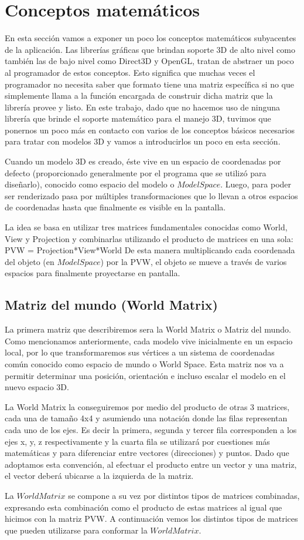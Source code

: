 \documentclass[a4paper]{article}
\begin{document}
\section{Conceptos matemáticos}
En esta sección vamos a exponer un poco los conceptos matemáticos subyacentes de la aplicación. Las librerías gráficas que brindan soporte 3D de alto nivel como también las de bajo nivel como Direct3D y OpenGL, tratan de abstraer un poco al programador de estos conceptos. Esto significa que muchas veces el programador no necesita saber que formato tiene una matriz específica si no que simplemente llama a la función encargada de construir dicha matriz que la librería provee y listo. En este trabajo, dado que no hacemos uso de ninguna librería que brinde el soporte matemático para el manejo 3D, tuvimos que ponernos un poco más en contacto con varios de los conceptos básicos necesarios para tratar con modelos 3D y vamos a introducirlos un poco en esta sección.

Cuando un modelo 3D es creado, éste vive en un espacio de coordenadas por defecto (proporcionado generalmente por el programa que se utilizó para diseñarlo), conocido como espacio del modelo o $Model Space$. Luego, para poder ser renderizado pasa por múltiples transformaciones que lo llevan a otros espacios de coordenadas hasta que finalmente es visible en la pantalla. 
\par La idea se basa en utilizar tres matrices fundamentales conocidas como World, View y Projection y combinarlas utilizando el producto de matrices en una sola: 
PVW = Projection*View*World
De esta manera  multiplicando cada coordenada del objeto (en $Model Space$) por la PVW, el objeto se mueve a través de varios espacios para finalmente proyectarse en pantalla.

\subsection{Matriz del mundo (World Matrix)}
La primera matriz que describiremos sera la  World Matrix o Matriz del mundo.
Como mencionamos anteriormente, cada modelo vive inicialmente en un espacio local,  por lo que transformaremos sus vértices a un sistema de coordenadas común conocido como espacio de mundo o World Space. Esta matriz nos va a permitir determinar una posición,  orientación e incluso escalar el modelo en el nuevo espacio 3D.
\par La World Matrix la conseguiremos por medio del producto de otras 3 matrices, cada una de tamaño 4x4 y asumiendo una notación donde las filas representan cada uno de los ejes. Es decir la primera, segunda y tercer fila corresponden a los ejes x, y, z respectivamente y la cuarta fila se utilizará por cuestiones más matemáticas y para diferenciar entre vectores (direcciones) y puntos. Dado que adoptamos esta convención, al efectuar el producto entre un vector y una matriz, el vector deberá ubicarse a la izquierda de la matriz.
\par La $World Matrix$ se compone a su vez por distintos tipos de matrices combinadas, expresando esta combinación como el producto de estas matrices al igual que hicimos con la matriz PVW. A continuación vemos los distintos tipos de matrices que pueden utilizarse para conformar la $World Matrix$.
\end{document}
